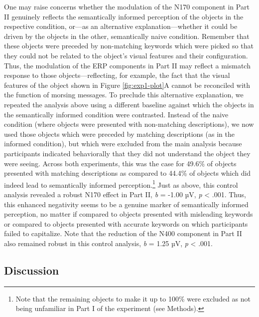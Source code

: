 \documentclass[
  english,
  man,11pt,floatsintext]{apa7}
\begin{document}
One may raise concerns whether the modulation of the N170 component in Part II genuinely reflects the semantically informed perception of the objects in the respective condition, or---as an alternative explanation---whether it could be driven by the objects in the other, semantically naive condition. Remember that these objects were preceded by non-matching keywords which were picked so that they could not be related to the object's visual features and their configuration. Thus, the modulation of the ERP components in Part II may reflect a mismatch response to those objects---reflecting, for example, the fact that the visual features of the object shown in Figure \ref{fig:exp1-plot}A cannot be reconciled with the function of morsing messages. To preclude this alternative explanation, we repeated the analysis above using a different baseline against which the objects in the semantically informed condition were contrasted. Instead of the naive condition (where objects were presented with non-matching descriptions), we now used those objects which were preceded by matching descriptions (as in the informed condition), but which were excluded from the main analysis because participants indicated behaviorally that they did not understand the object they were seeing. Across both experiments, this was the case for 49.6\% of objects presented with matching descriptions as compared to 44.4\% of objects which did indeed lead to semantically informed perception.\footnote{Note that the remaining objects to make it up to 100\% were excluded as not being unfamiliar in Part I of the experiment (see Methods).} Just as above, this control analysis revealed a robust N170 effect in Part II, \emph{b} = -1.00 µV, \emph{p} \textless{} .001. Thus, this enhanced negativity seems to be a genuine marker of semantically informed perception, no matter if compared to objects presented with misleading keywords or compared to objects presented with accurate keywords on which participants failed to capitalize. Note that the reduction of the N400 component in Part II also remained robust in this control analysis, \emph{b} = 1.25 µV, \emph{p} \textless{} .001.

\hypertarget{discussion-1}{%
\subsection{Discussion}\label{discussion-1}}
\end{document}
